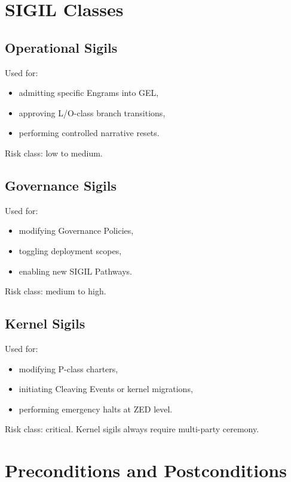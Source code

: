 \section{SIGIL Classes}

\subsection{Operational Sigils}

Used for:
\begin{itemize}
    \item admitting specific Engrams into GEL,
    \item approving L/O-class branch transitions,
    \item performing controlled narrative resets.
\end{itemize}

Risk class: low to medium.

\subsection{Governance Sigils}

Used for:
\begin{itemize}
    \item modifying Governance Policies,
    \item toggling deployment scopes,
    \item enabling new SIGIL Pathways.
\end{itemize}

Risk class: medium to high.

\subsection{Kernel Sigils}

Used for:
\begin{itemize}
    \item modifying P-class charters,
    \item initiating Cleaving Events or kernel migrations,
    \item performing emergency halts at ZED level.
\end{itemize}

Risk class: critical.  
Kernel sigils always require multi-party ceremony.

\section{Preconditions and Postconditions}

